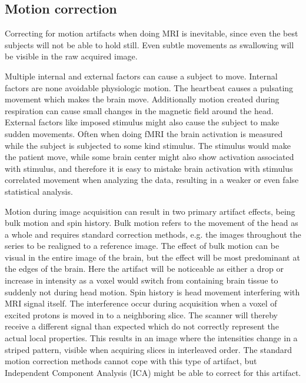 \subsection{Motion correction}

Correcting for motion artifacts when doing MRI is inevitable, since even the best subjects will not be able to hold still. Even subtle movements as swallowing will be visible in the raw acquired image.\cite{Poldrack2011} 

Multiple internal and external factors can cause a subject to move. Internal factors are none avoidable physiologic motion. The heartbeat causes a pulsating movement which makes the brain move. Additionally motion created during respiration can cause small changes in the magnetic field around the head. External factors like imposed stimulus might also cause the subject to make sudden movements. Often when doing fMRI the brain activation is measured while the subject is subjected to some kind stimulus. The stimulus would make the patient move, while some brain center might also show activation associated with stimulus,  and therefore it is easy to mistake brain activation with stimulus correlated movement when analyzing the data, resulting in a weaker or even false statistical analysis.\cite{Poldrack2011} 

Motion during image acquisition can result in two primary artifact effects, being bulk motion and spin history. Bulk motion refers to the movement of the head as a whole and requires standard correction methods, e.g. the images throughout the series to be realigned to a reference image. The effect of bulk motion can be visual in the entire image of the brain, but the effect will be most predominant at the edges of the brain. Here the artifact will be noticeable as either a drop or increase in intensity as a voxel would switch from containing brain tissue to suddenly not during head motion.  
Spin history is head movement interfering with MRI signal itself. The interference occur during acquisition when a voxel of excited protons is moved in to a neighboring slice. The scanner will thereby receive a different signal than expected which do not correctly represent the actual local properties. This results in an image where the intensities change in a striped pattern, visible when acquiring slices in interleaved order. The standard motion correction methods cannot cope with this type of artifact, but Independent Component Analysis (ICA) might be able to correct for this artifact.\cite{Poldrack2011} 

